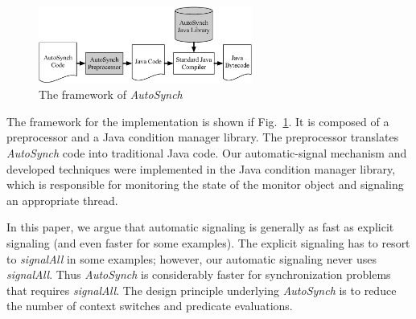\documentclass{sigplanconf}
\begin{document}
\begin{figure}[ht!]
  \centering
  \includegraphics[width=70mm]{fig/flow.eps}
  \caption{The framework of {\em  AutoSynch}}
  \label{fig:fw}
\end{figure}


The framework for the implementation is shown if Fig.~\ref{fig:fw}.
It is composed of a 
preprocessor and a Java condition manager library. The preprocessor translates 
{\em AutoSynch} code into traditional Java code. 
Our automatic-signal mechanism and 
developed techniques were implemented in the Java condition manager library, 
which is responsible for monitoring the state of the monitor object
and signaling an appropriate thread.


%


In this paper, we argue that automatic signaling is generally as fast as explicit 
signaling (and even faster for some examples). 
The explicit signaling has 
to resort to {\em signalAll} in some examples; however, our automatic signaling never 
uses {\em signalAll}. Thus {\em AutoSynch} is 
considerably faster for synchronization problems that requires 
{\em signalAll}. The design principle underlying {\em AutoSynch} is to reduce 
the number of context switches and predicate evaluations.
\end{document}
